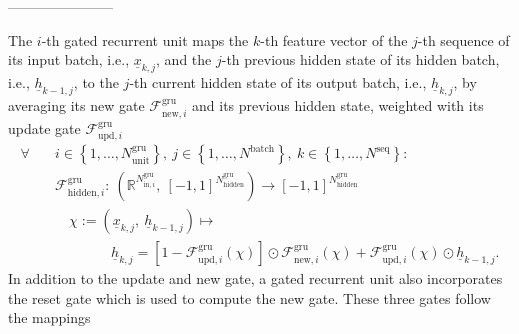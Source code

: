 -----------------------

The $i$-th gated recurrent unit 
maps the $k$-th feature vector of
the $j$-th sequence 
of its input batch, i.e.,
$\underline x_{k,j}$,
and the $j$-th previous hidden state
of its hidden batch,
i.e., $\underline h_{k-1,j}$,
to the $j$-th current hidden state of its output batch,
i.e., $\underline h_{k,j}$,
by averaging
its new gate 
$\mathcal{F}^\text{gru}_{\text{new},i}$
and its previous hidden state,
weighted with its update gate
$\mathcal{F}^\text{gru}_{\text{upd},i}$
\begin{align} \label{eq:gru_hidden}
    \forall \quad &
    i \in \left\{
        1, \dots, N^\text{gru}_\text{unit}
    \right\}
    ,\ 
    j \in \left\{
        1, \dots, N^\text{batch}
    \right\}
    ,\ 
    k \in \left\{
        1, \dots, N^\text{seq}
    \right\}
    :
    \nonumber \\ &
    \mathcal{F}^\text{gru}_{\text{hidden},i}
    :\
    \left(
        \mathbb{R}^{
            N^\text{gru}_{\text{in}, i}
        }
        ,\ 
        \left[
            -1, 1
        \right]^{
            N^\text{gru}_{\text{hidden}}
        }
    \right)
    \rightarrow 
    \left[
        -1, 1
    \right]^{
        N^\text{gru}_{\text{hidden}}
    }
    \nonumber \\ & \quad
    \chi
    :=
    \left(
        \underline x_{k,j}
        ,\ 
        \underline h_{k-1,j}
    \right)
    \mapsto
    \nonumber \\ & \qquad \qquad
    \underline h_{k,j}
    =
    \left[
        1 
        -
        \mathcal{F}^\text{gru}_{\text{upd},i} \left(
            \chi
        \right)
    \right]
    \odot
    \mathcal{F}^\text{gru}_{\text{new},i} \left(
        \chi
    \right)
    +
    \mathcal{F}^\text{gru}_{\text{upd},i} \left(
        \chi
    \right)
    \odot
    \underline h_{k-1,j}
    .
\end{align}
In addition to the update and new gate,
a gated recurrent unit also incorporates
the reset gate which is used to compute the new gate.
These three gates
follow the mappings
